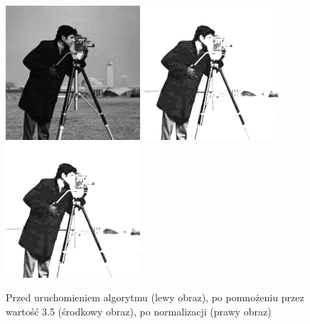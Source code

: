 \documentclass[a4paper,12pt]{book}
\begin{document}
\begin{figure}[H]
	\caption{Przed uruchomieniem algorytmu (lewy obraz), po pomnożeniu przez wartość 3.5 (środkowy obraz), po normalizacji (prawy obraz)}
	\includegraphics[width=5cm, height=5cm]{man-unmodified.jpg}
	\includegraphics[width=5cm, height=5cm]{2-2/multiply-gray-const-photoman-35.png}
	\includegraphics[width=5cm, height=5cm]{2-2/multiply-gray-const-photoman-35-norm.png}
\end{figure}
\end{document}

